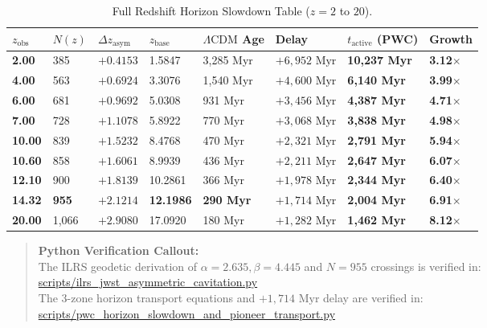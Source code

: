 \documentclass[11pt,a4paper]{article}
\begin{document}
\begin{table}[!htbp]
\centering
\caption{Full Redshift Horizon Slowdown Table ($z=2$ to $20$).}
\label{tab:redshift_slowdown}
\footnotesize
\setlength{\tabcolsep}{3.5pt}
\renewcommand{\arraystretch}{1.18}
\begin{tabularx}{\textwidth}{C{1.1cm} C{1.0cm} C{1.5cm} C{1.4cm} Z Z Z C{1.4cm}}
\toprule
$z_{\text{obs}}$ & $N(z)$ & $\Delta z_{\text{asym}}$ & $z_{\text{base}}$ & $\Lambda\text{CDM}$ Age & Delay & $t_{\text{active}}$ (PWC) & Growth \\
\midrule
\textbf{2.00} & 385 & $+0.4153$ & 1.5847 & 3,285 Myr & $+6,952\text{ Myr}$ & \textbf{10,237 Myr} & \textbf{3.12$\times$} \\
\textbf{4.00} & 563 & $+0.6924$ & 3.3076 & 1,540 Myr & $+4,600\text{ Myr}$ & \textbf{6,140 Myr} & \textbf{3.99$\times$} \\
\textbf{6.00} & 681 & $+0.9692$ & 5.0308 & 931 Myr & $+3,456\text{ Myr}$ & \textbf{4,387 Myr} & \textbf{4.71$\times$} \\
\textbf{7.00} & 728 & $+1.1078$ & 5.8922 & 770 Myr & $+3,068\text{ Myr}$ & \textbf{3,838 Myr} & \textbf{4.98$\times$} \\
\textbf{10.00} & 839 & $+1.5232$ & 8.4768 & 470 Myr & $+2,321\text{ Myr}$ & \textbf{2,791 Myr} & \textbf{5.94$\times$} \\
\textbf{10.60} & 858 & $+1.6061$ & 8.9939 & 436 Myr & $+2,211\text{ Myr}$ & \textbf{2,647 Myr} & \textbf{6.07$\times$} \\
\textbf{12.10} & 900 & $+1.8139$ & 10.2861 & 366 Myr & $+1,978\text{ Myr}$ & \textbf{2,344 Myr} & \textbf{6.40$\times$} \\
\textbf{14.32} & \textbf{955} & \textbf{$+2.1214$} & \textbf{12.1986} & \textbf{290 Myr} & \textbf{$+1,714\text{ Myr}$} & \textbf{2,004 Myr} & \textbf{6.91$\times$} \\
\textbf{20.00} & 1,066 & $+2.9080$ & 17.0920 & 180 Myr & $+1,282\text{ Myr}$ & \textbf{1,462 Myr} & \textbf{8.12$\times$} \\
\bottomrule
\end{tabularx}
\end{table}

\begin{quote}
\textbf{Python Verification Callout:}\\
The ILRS geodetic derivation of $\alpha=2.635, \beta=4.445$ and $N=955$ crossings is verified in:\\
\url{scripts/ilrs_jwst_asymmetric_cavitation.py}\\
The 3-zone horizon transport equations and $+1,714\text{ Myr}$ delay are verified in:\\
\url{scripts/pwc_horizon_slowdown_and_pioneer_transport.py}
\end{quote}
\end{document}

